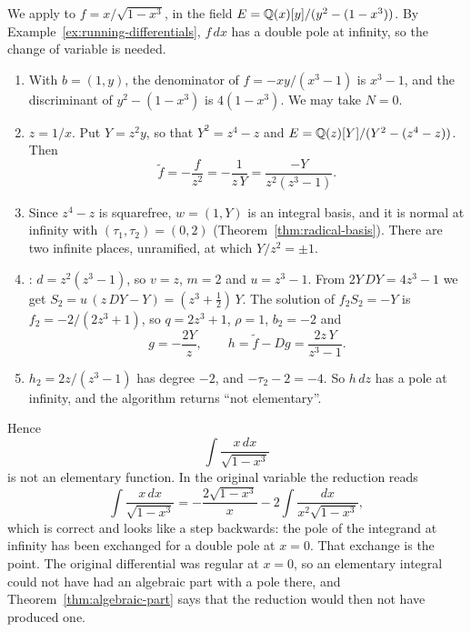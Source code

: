 \begin{example}\label{ex:running-algpart}
We apply  to $f = x/\sqrt{1 - x^3}$, in the field $E =
\mathbb{Q}(x)[y]/(y^2 - (1 - x^3))$. By Example~\ref{ex:running-differentials},
$f\,dx$ has a double pole at infinity, so the change of variable is needed.
\begin{enumerate}
\item With $b = (1, y)$, the denominator of $f = -xy/(x^3 - 1)$ is $x^3 - 1$,
  and the discriminant of $y^2 - (1 - x^3)$ is $4 (1 - x^3)$. We may take $N =
  0$.
\item $z = 1/x$. Put $Y = z^2 y$, so that $Y^2 = z^4 - z$ and $E =
  \mathbb{Q}(z)[Y]/(Y^2 - (z^4 - z))$. Then
  \[
    \tilde f = -\frac{f}{z^2} = -\frac{1}{z\,Y} = \frac{-Y}{z^2 (z^3 - 1)} .
  \]
\item Since $z^4 - z$ is squarefree, $w = (1, Y)$ is an integral basis, and it
  is normal at infinity with $(\tau_1, \tau_2) = (0, 2)$
  (Theorem~\ref{thm:radical-basis}). There are two infinite places, unramified, at
  which $Y/z^2 = \pm 1$.
\item {}: $d = z^2 (z^3 - 1)$, so $v = z$, $m = 2$ and $u
  = z^3 - 1$. From $2 Y\, DY = 4z^3 - 1$ we get $S_2 = u\,(z\, DY - Y) =
  (z^3 + \frac12)\, Y$. The solution of $f_2 S_2 = -Y$ is $f_2 = -2/(2 z^3 +
  1)$, so $q = 2z^3 + 1$, $\rho = 1$, $b_2 = -2$ and
  \[
    g = -\frac{2Y}{z}, \qquad
    h = \tilde f - Dg = \frac{2 z\, Y}{z^3 - 1} .
  \]
\item $h_2 = 2z/(z^3 - 1)$ has degree $-2$, and $-\tau_2 - 2 = -4$. So $h\,dz$
  has a pole at infinity, and the algorithm returns ``not elementary''.
\end{enumerate}
Hence
\[
  \int \frac{x\,dx}{\sqrt{1 - x^3}}
\]
is not an elementary function. In the original variable the reduction reads
\[
  \int \frac{x\,dx}{\sqrt{1 - x^3}}
  = -\frac{2 \sqrt{1 - x^3}}{x} - 2 \int \frac{dx}{x^2 \sqrt{1 - x^3}} ,
\]
which is correct and looks like a step backwards: the pole of the integrand
at infinity has been exchanged for a double pole at $x = 0$. That exchange is
the point. The original differential was regular at $x = 0$, so an
elementary integral could not have had an algebraic part with a pole there,
and Theorem~\ref{thm:algebraic-part} says that the reduction would then not
have produced one.
\end{example}

